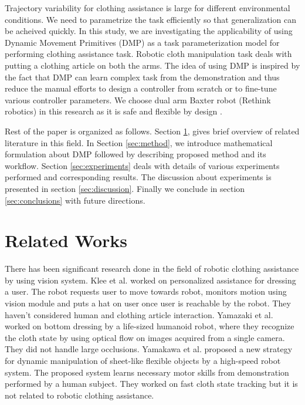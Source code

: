 \documentclass[sigconf]{acmart}
\begin{document}
Trajectory variability for clothing assistance is large for different environmental conditions. We need to parametrize the task efficiently so that generalization can be acheived quickly. In this study, we are investigating the applicability of using Dynamic Movement Primitives (DMP) as a task parameterization model for performing clothing assistance task. Robotic cloth manipulation task deals with putting a clothing article on both the arms. The idea of using DMP is inspired by the fact that DMP can learn complex task from the demonstration \cite{ijspeert2003learning, schaal2006dynamic, ijspeert2013dynamical} and thus reduce the manual efforts to design a controller from scratch or to fine-tune various controller parameters. We choose dual arm Baxter robot (Rethink robotics) in this research as it is safe and flexible by design \cite{fitzgerald2013developing}.

Rest of the paper is organized as follows. Section \ref{sec:related_works}, gives brief overview of related literature in this field. In Section \ref{sec:method}, we introduce mathematical formulation about DMP followed by describing proposed method and its workflow. Section \ref{sec:experiments} deals with details of various experiments performed and corresponding results. The discussion about experiments is presented in section \ref{sec:discussion}. Finally we conclude in section \ref{sec:conclusions} with future directions.

\section{Related Works}
\label{sec:related_works}
There has been significant research done in the field of robotic clothing assistance by using vision system. Klee et al. \cite{klee2015personalized} worked on personalized assistance for dressing a user. The robot requests user to move towards robot, monitors motion using vision module and puts a hat on user once user is reachable by the robot. They haven't considered human and clothing article interaction. Yamazaki et al. \cite{yamazaki2013method, yamazaki2014bottom}  worked on bottom dressing by a life-sized humanoid robot, where they recognize the cloth state by using optical flow on images acquired from a single camera. They did not handle large occlusions. Yamakawa et al. \cite{yamakawa2011dynamic} proposed a new strategy for dynamic manipulation of sheet-like flexible objects by a high-speed robot system. The proposed system learns necessary motor skills from demonstration performed by a human subject. They worked on fast cloth state tracking but it is not related to robotic clothing assistance.
\end{document}
